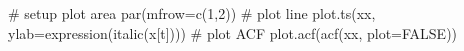 \begin{Schunk}
\begin{Sinput}
 # setup plot area
 par(mfrow=c(1,2))
 # plot line
 plot.ts(xx, ylab=expression(italic(x[t])))
 # plot ACF
 plot.acf(acf(xx, plot=FALSE))
\end{Sinput}
\end{Schunk}
